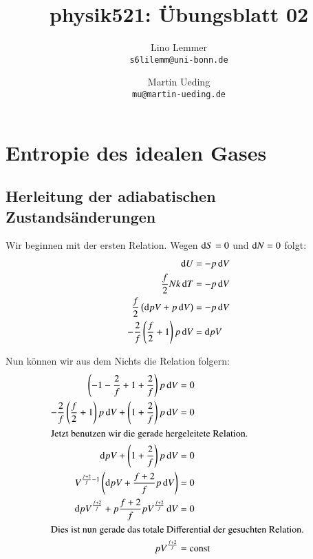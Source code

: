 

\setcounter{section}{1}
\renewcommand\thesection{H\,2.\arabic{section}}
\renewcommand\thesubsection{\thesection.\alph{subsection}}

\title{physik521: Übungsblatt 02}
\author{%
    Lino Lemmer \\ \small{\texttt{s6lilemm@uni-bonn.de}}
    \and
    Martin Ueding \\ \small{\texttt{mu@martin-ueding.de}}
}


\maketitle
\section{Entropie des idealen Gases}


\subsection{Herleitung der adiabatischen Zustandsänderungen}

Wir beginnen mit der ersten Relation. Wegen $\dif S = 0$ und $\dif N = 0$ folgt:
\begin{align*}
    \dif U &= - p \dif V \\
    \frac f2 N k \dif T &= - p \dif V \\
    \frac f2 \left( \dif p V + p \dif V \right) &= - p \dif V \\
        - \frac 2f \left( \frac f2 + 1 \right) p \dif V &= \dif p V
\end{align*}

Nun können wir aus dem Nichts die Relation folgern:
\begin{align*}
    \left( -1 - \frac 2f + 1 + \frac 2f \right) p \dif V &= 0 \\
    - \frac 2f \left( \frac f2 + 1 \right) p \dif V + \left( 1 + \frac 2f \right) p \dif V &= 0 \\
    \intertext{%
        Jetzt benutzen wir die gerade hergeleitete Relation.
    }
    \dif p V + \left( 1 + \frac 2f \right) p \dif V &= 0 \\
    V^{\frac{f+2}f -1} \left( \dif p V + \frac{f+2}f p \dif V \right) &= 0 \\
    \dif p V^{\frac{f+2}f} + p \frac{f+2}f p V^{\frac{f+2}f} \dif V &= 0 \\
    \intertext{%
        Dies ist nun gerade das totale Differential der
        gesuchten Relation.
    }
    p V^{\frac{f+2}f} &= \text{const}
\end{align*}

